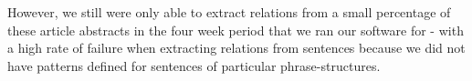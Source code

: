 However, we still were only able to extract relations from a small percentage of these
article abstracts in the four week period that we ran our software for - with a high rate
of failure when extracting relations from sentences because we did not have patterns
defined for sentences of particular phrase-structures.
